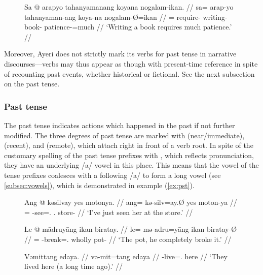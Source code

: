 \begin{figure}[h]
\ex\begingl
	\gla Sa @ arapyo tahanyamanang koyana nogalam-ikan. //
	\glb sa= arap-yo tahanyaman-ang koya-na nogalam-Ø=ikan //
	\glc \PatT{}= require-\TsgN{} writing-\Aarg{} book-\Gen{} 
		patience-\Top{}=much //
	\glft `Writing a book requires much patience.' //
\endgl\xe
\end{figure}

Moreover, Ayeri does not strictly mark its verbs for past tense in narrative 
discourses---verbs may thus appear as though with present-time reference in 
spite of recounting past events, whether historical or fictional. See the next 
subsection on the past tense.


\subsubsection{Past tense}
\label{subsubsec:past}
The past tense indicates actions which happened in the past if not further
modified. The three degrees of past tense are marked with 
(near/immediate),  (recent), and  (remote), which
attach right in front of a verb root. In spite of the customary spelling of the
past tense prefixes with , which reflects pronunciation, they have an
underlying /a/ vowel in this place. This means that the vowel of the tense
prefixes coalesces with a following /a/ to form a long vowel (see
\autoref{subsec:vowels}), which is demonstrated in example (\ref{ex:pst}).

\begin{figure}
\pex
\a\label{ex:npst}\begingl
	\gla Ang @ kəsilvay yes motonya. //
	\glb ang= kə-silv=ay.Ø yes moton-ya //
	\glc \AgtT{}= \NPst{}-see=\Fsg{}.\Top{} \TsgF{}.\Parg{} store-\Loc{} //
	\glft `I've just seen her at the store.' //
\endgl

\a\label{ex:pst}\begingl
	\gla Le @ mādruyāng ikan biratay. //
	\glb le= mə-adru=yāng ikan biratay-Ø //
	\glc \PatTI{}= \Pst{}-break=\TsgM{}.\Aarg{} wholly pot-\Top{} //
	\glft `The pot, he completely broke it.' //
\endgl

\a\label{ex:rpst}\begingl
	\gla Vəmittang edaya. //
	\glb və-mit=tang edaya //
	\glc \RPst{}-live=\TplM{}.\Aarg{} here //
	\glft `They lived here (a long time ago).' //
\endgl
\xe
\end{figure}

